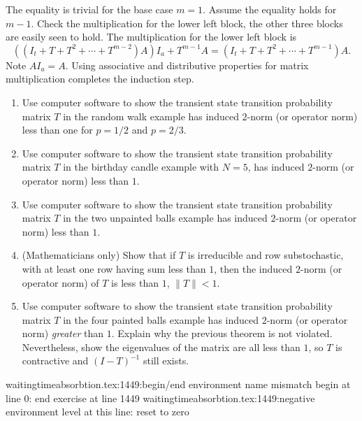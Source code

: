 \documentclass[12pt]{article}
\begin{document}
\begin{solution}
    The equality is trivial for the base case \( m=1 \).  Assume the
    equality holds for \( m-1 \).  Check the multiplication for the
    lower left block, the other three blocks are easily seen to hold.
    The multiplication for the lower left block is
    \[
        \left( (I_t + T + T^2 + \cdots + T^{m-2})A \right) I_a + T^{m-1}A
        = (I_t + T + T^2 + \cdots + T^{m-1})A.
    \] Note \( A I_a = A \).  Using associative and distributive
    properties for matrix multiplication completes the induction step.
\end{solution}

\begin{exercise}
    \begin{enumerate}[label=(\alph*)]
    \item
        Use computer software to show the transient state transition
        probability matrix \( T \) in the random walk example has
        induced \( 2 \)-norm (or operator norm) less than one for \( p =
        1/2 \) and \( p = 2/3 \).
    \item
        Use computer software to show the transient state transition
        probability matrix \( T \) in the birthday candle example with \(
        N=5 \), has induced \( 2 \)-norm (or operator norm) less than \(
        1 \).
    \item
        Use computer software to show the transient state transition
        probability matrix \( T \) in the two unpainted balls example
        has induced \( 2 \)-norm (or operator norm) less than \( 1 \).
    \item
        (Mathematicians only) Show that if \( T \) is irreducible and
        row substochastic, with at least one row having sum less than \(
        1 \), then the induced \( 2 \)-norm (or operator norm) of \( T \)
        is less than \( 1 \), \( \| T \| < 1 \).
    \item
        Use computer software to show the transient state transition
        probability matrix \( T \) in the four painted balls example has
        induced \( 2 \)-norm (or operator norm) \emph{greater} than \( 1
        \).  Explain why the previous theorem is not violated.
        Nevertheless, show the eigenvalues of the matrix are all less
        than \( 1 \), so \( T \) is contractive and \( (I-T)^{-1} \)
        still exists.
\end{enumerate}
waitingtimeabsorbtion.tex:1449:begin/end environment name mismatch
	begin {} at line 0: end {exercise} at line 1449
waitingtimeabsorbtion.tex:1449:negative environment level at this line: reset to zero
\end{exercise}
\end{document}
